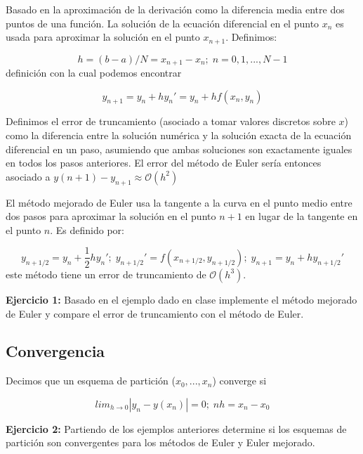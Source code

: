 \documentclass[10.5pt]{article}
\begin{document}
Basado en la aproximación de la derivación como la diferencia media entre dos puntos de una función. La solución de la ecuación diferencial en el punto $x_{n}$ es usada para aproximar la solución en el punto $x_{n+1}$. Definimos:

\begin{equation}
h=(b-a)/N=x_{n+1}-x_{n};\; n=0,1,...,N-1
\end{equation} definición con la cual podemos encontrar 

\begin{equation}
y_{n+1}=y_{n}+hy_{n}'=y_{n}+hf(x_{n},y_{n})
\end{equation}

Definimos el error de truncamiento (asociado a tomar valores discretos sobre $x$) como la diferencia entre la solución numérica y la solución exacta de la ecuación diferencial en un paso, asumiendo que ambas soluciones son exactamente iguales en todos los pasos anteriores. El error del método de Euler sería entonces asociado a $y(n+1)-y_{n+1}\approx \mathcal{O}(h^{2})$

El método mejorado de Euler usa la tangente a la curva en el punto medio entre dos pasos para aproximar la solución en el punto $n+1$ en lugar de la tangente en el punto $n$. Es definido por:

\begin{equation}
y_{n+1/2}=y_{n}+\frac{1}{2}hy_{n}';\; y_{n+1/2}'=f(x_{n+1/2},y_{n+1/2});\; y_{n+1}=y_{n}+hy_{n+1/2}'
\end{equation} este método tiene un error de truncamiento de $\mathcal{O}(h^{3})$. 

{\bf Ejercicio 1:} Basado en el ejemplo dado en clase implemente el método mejorado de Euler y compare el error de truncamiento con el método de Euler.

\subsection{Convergencia}

Decimos que un esquema de partición ($x_{0},...,x_{n}$) converge si

\begin{equation}
lim_{h\rightarrow 0}|y_{n}-y(x_{n})|=0;\; nh=x_{n}-x_{0}
\end{equation}

{\bf Ejercicio 2:} Partiendo de los ejemplos anteriores determine si los esquemas de partición son convergentes para los métodos de Euler y Euler mejorado.
\end{document}
